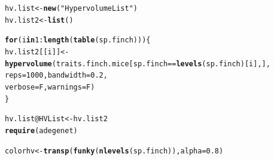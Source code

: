 \documentclass[12pt]{article}\usepackage[]{graphicx}\usepackage[]{color}
\makeatletter
\newcommand{\hlnum}[1]{\textcolor[rgb]{0.686,0.059,0.569}{#1}}%
\newcommand{\hlstr}[1]{\textcolor[rgb]{0.192,0.494,0.8}{#1}}%
\newcommand{\hlopt}[1]{\textcolor[rgb]{0,0,0}{#1}}%
\newcommand{\hlstd}[1]{\textcolor[rgb]{0.345,0.345,0.345}{#1}}%
\newcommand{\hlkwa}[1]{\textcolor[rgb]{0.161,0.373,0.58}{\textbf{#1}}}%
\newcommand{\hlkwb}[1]{\textcolor[rgb]{0.69,0.353,0.396}{#1}}%
\newcommand{\hlkwc}[1]{\textcolor[rgb]{0.333,0.667,0.333}{#1}}%
\newcommand{\hlkwd}[1]{\textcolor[rgb]{0.737,0.353,0.396}{\textbf{#1}}}%
\newenvironment{kframe}{%
 \def\at@end@of@kframe{}%
 \ifinner\ifhmode%
  \def\at@end@of@kframe{\end{minipage}}%
  \begin{minipage}{\columnwidth}%
 \fi\fi%
 \def\FrameCommand##1{\hskip\@totalleftmargin \hskip-\fboxsep
 \colorbox{shadecolor}{##1}\hskip-\fboxsep
     \hskip-\linewidth \hskip-\@totalleftmargin \hskip\columnwidth}%
 \MakeFramed {\advance\hsize-\width
   \@totalleftmargin\z@ \linewidth\hsize
   \@setminipage}}%
 {\par\unskip\endMakeFramed%
 \at@end@of@kframe}
\newenvironment{knitrout}{}{} %
\makeatother
\begin{document}
\begin{knitrout}
\color{fgcolor}\begin{kframe}
\begin{alltt}
\hlstd{hv.list}\hlkwb{<-}\hlkwd{new}\hlstd{(}\hlstr{"HypervolumeList"}\hlstd{)}
\hlstd{hv.list2}\hlkwb{<-}\hlkwd{list}\hlstd{()}

\hlkwa{for}\hlstd{(i} \hlkwa{in} \hlnum{1}\hlopt{:} \hlkwd{length}\hlstd{(}\hlkwd{table}\hlstd{(sp.finch))) \{}
  \hlstd{hv.list2[[i]]}\hlkwb{<-}\hlkwd{hypervolume}\hlstd{(traits.finch.mice[sp.finch}\hlopt{==}\hlkwd{levels}\hlstd{(sp.finch)[i], ],}
                \hlkwc{reps}\hlstd{=}\hlnum{1000}\hlstd{,}\hlkwc{bandwidth}\hlstd{=}\hlnum{0.2}\hlstd{,}
                \hlkwc{verbose}\hlstd{=F,} \hlkwc{warnings}\hlstd{=F)}
\hlstd{\}}

\hlstd{hv.list}\hlopt{@}\hlkwc{HVList}\hlkwb{<-}\hlstd{hv.list2}
\hlkwd{require}\hlstd{(adegenet)}
\end{alltt}


{\ttfamily\noindent\itshape\color{messagecolor}{\#\# Loading required package: adegenet\\\#\#\ \ \ \ ==========================\\\#\#\ \ \ \  adegenet 1.4-2 is loaded\\\#\#\ \ \ \ ==========================\\\#\# \\\#\#\ \ - to start, type '?adegenet'\\\#\#\ \ - to browse adegenet website, type 'adegenetWeb()'\\\#\#\ \ - to post questions/comments: adegenet-forum@lists.r-forge.r-project.org}}\begin{alltt}
\hlstd{colorhv}\hlkwb{<-}\hlkwd{transp}\hlstd{(}\hlkwd{funky}\hlstd{(}\hlkwd{nlevels}\hlstd{(sp.finch)),} \hlkwc{alpha}\hlstd{=}\hlnum{0.8}\hlstd{)}


\end{alltt}
\end{kframe}
\end{knitrout}
\end{document}
